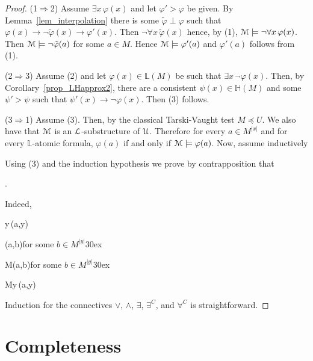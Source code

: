 \documentclass[11pt,oneside]{amsart}
\theoremstyle{plain}
\theoremstyle{remark}
\begin{document}
\begin{proof}
  (1$\Rightarrow$2) Assume $\exists x\,\varphi(x)$ and let $\varphi'>\varphi$ be given.
  By Lemma~\ref{lem_interpolation} there is some $\tilde{\varphi}\perp\varphi$ such that  $\varphi(x)\rightarrow\neg\tilde{\varphi}(x)\rightarrow\varphi'(x)$.
  Then $\neg\forall x\,\tilde{\varphi}(x)$ hence, by (1), ${\EuScript M}\models\neg\forall x\,\varphi(x)$.
  Then ${\EuScript M}\models\neg\tilde{\varphi}(a)$ for some $a\in M$. Hence ${\EuScript M}\models\varphi'(a)$ and $\varphi'(a)$ follows from (1).

  (2$\Rightarrow$3)
  Assume (2) and let $\varphi(x)\in\mathds{L}(M)$ be such that $\exists x\,\neg\varphi(x)$.
  Then, by Corollary~\ref{prop_LHapprox2}, there are a consistent $\psi(x)\in\mathds{H}(M)$ and some $\psi'>\psi$ such that $\psi'(x)\rightarrow\neg\varphi(x)$.
  Then (3) follows.

  (3$\Rightarrow$1)
  Assume (3).
  Then, by the classical Tarski-Vaught test $M\preceq U$.
  We also have that  ${\EuScript M}$ is an ${\EuScript L}$-substructure of ${\EuScript U}$.
  Therefore for every $a\in M^{|x|}$ and for every $\mathds{L}$-atomic formula,  $\varphi(a)$ if and only if ${\EuScript M}\models\varphi(a)$.
  Now, assume inductively
  

  Using (3) and the induction hypothesis we prove by contrapposition that

  .

  Indeed,

  {\Rightarrow}{\exists y\,\neg\varphi(a,y)}
  
  \ceq{}
  {\Rightarrow}
  {\neg\varphi(a,b)}\hfill for some $b\in M^{|y|}$\kern30ex

  \ceq{}
  {\Rightarrow}
  {{\EuScript M}\models\neg\varphi(a,b)}\hfill for some $b\in M^{|y|}$\kern30ex

  \ceq{}
  {\Rightarrow}
  {{\EuScript M}\not\models\forall y\,\varphi(a,y)}

  Induction for the connectives $\vee$, $\wedge$, $\exists$, $\exists^C$, and $\forall^C$ is straightforward.
\end{proof}

\section{Completeness}
\end{document}
